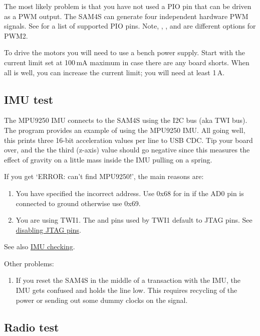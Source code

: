 The most likely problem is that you have not used a PIO pin that can
be driven as a PWM output. The SAM4S can generate four independent
hardware PWM signals. See  for a list of
supported PIO pins. Note, , , and  are
different options for PWM2.

To drive the motors you will need to use a bench power supply. Start
with the current limit set at 100\,mA maximum in case there are any
board shorts.  When all is well, you can increase the current limit;
you will need at least 1\,A.

\subsection{IMU test}
\label{imu-test}

The MPU9250 IMU connects to the SAM4S using the I2C bus (aka TWI bus).
The program  provides an
example of using the MPU9250 IMU.  All going well, this prints three
16-bit acceleration values per line to USB CDC. Tip your board over,
and the the third (z-axis) value should go negative since this
measures the effect of gravity on a little mass inside the IMU pulling
on a spring.

If you get `ERROR: can't find MPU9250!', the main reasons are:

\begin{enumerate}
\item
  You have specified the incorrect address.  Use 0x68 for
   in  if the AD0 pin is connected to
  ground otherwise use 0x69.
\item
  You are using TWI1. The  and  pins used by TWI1
  default to JTAG pins. See
  \protect\hyperref[disabling-jtag-pins]{disabling JTAG pins}.
\end{enumerate}
%
See also \protect\hyperref[checking-IMU]{IMU checking}.

Other problems:
%
\begin{enumerate}
\item If you reset the SAM4S in the middle of a transaction with the
IMU, the IMU gets confused and holds the  line low. This
requires recycling of the power or sending out some dummy clocks on
the  signal.
\end{enumerate}


\subsection{Radio test}
\label{radio-test}

